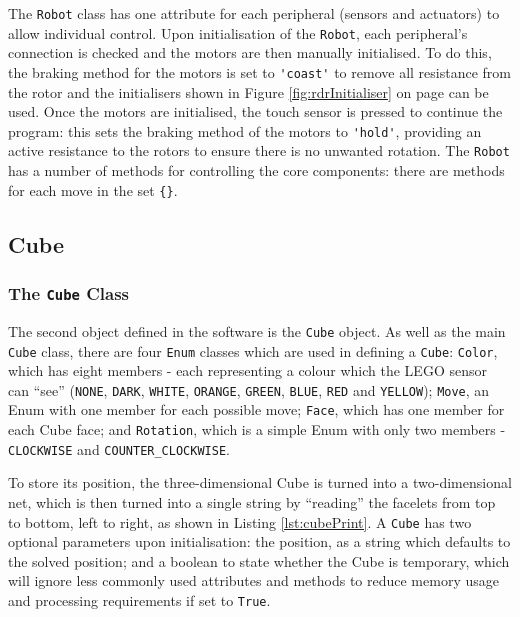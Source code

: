 \documentclass{report}
\newcommand{\moveset}[1]{\uppercase{\texttt{\{\formatmoves{#1}\}}}}
\newcommand{\lego}{LEGO }
\begin{document}
    The \lstinline|Robot| class has one attribute for each peripheral (sensors and actuators) to allow individual control. Upon initialisation of the \lstinline|Robot|, each peripheral's connection is checked and the motors are then manually initialised. To do this, the braking method for the motors is set to \lstinline|'coast'| to remove all resistance from the rotor and the initialisers shown in Figure \ref{fig:rdrInitialiser} on page \pageref{fig:rdrInitialiser} can be used. Once the motors are initialised, the touch sensor is pressed to continue the program: this sets the braking method of the motors to \lstinline|'hold'|, providing an active resistance to the rotors to ensure there is no unwanted rotation. The \lstinline|Robot| has a number of methods for controlling the core components: there are methods for each move in the set \moveset{x.x2y.y'y2d.d'd"}.
    
    \subsection{Cube}
    
    \subsubsection{The \lstinline|Cube| Class}
    
    The second object defined in the software is the \lstinline|Cube| object.  As well as the main \lstinline|Cube| class, there are four \lstinline|Enum| classes which are used in defining a \lstinline|Cube|: \lstinline|Color|, which has eight members - each representing a colour which the \lego sensor can \enquote{see} (\lstinline|NONE|, \lstinline|DARK|, \lstinline|WHITE|, \lstinline|ORANGE|, \lstinline|GREEN|, \lstinline|BLUE|, \lstinline|RED| and \lstinline|YELLOW|); \lstinline|Move|, an Enum with one member for each possible move; \lstinline|Face|, which has one member for each Cube face; and \lstinline|Rotation|, which is a simple Enum with only two members - \lstinline|CLOCKWISE| and \lstinline|COUNTER_CLOCKWISE|.
    
    To store its position, the three-dimensional Cube is turned into a two-dimensional net, which is then turned into a single string by \enquote{reading} the facelets from top to bottom, left to right, as shown in Listing \ref{lst:cubePrint}. A \lstinline|Cube| has two optional parameters upon initialisation: the position, as a string which defaults to the solved position; and a boolean to state whether the Cube is temporary, which will ignore less commonly used attributes and methods to reduce memory usage and processing requirements if set to \lstinline|True|. 
    
\end{document}
